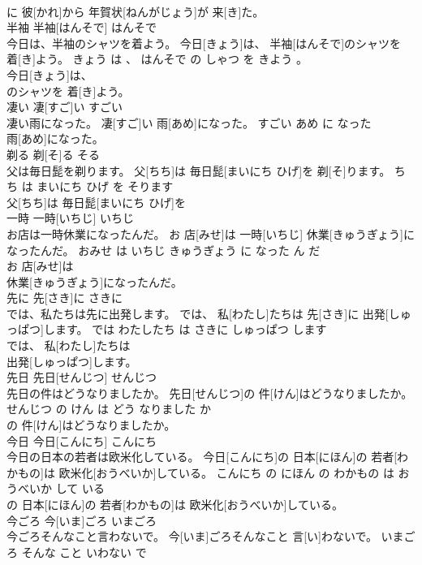 \documentclass[8pt]{extreport}
\begin{document}
\begin{CJK}{UTF8}{min}
\\	に 彼[かれ]から 年賀状[ねんがじょう]が 来[き]た。			
\\	半袖	半袖[はんそで]	はんそで	
\\	今日は、半袖のシャツを着よう。	今日[きょう]は、 半袖[はんそで]のシャツを 着[き]よう。	きょう は 、 はんそで の しゃつ を きよう 。	
\\	今日[きょう]は、
\\	のシャツを 着[き]よう。			
\\	凄い	凄[すご]い	すごい	
\\	凄い雨になった。	凄[すご]い 雨[あめ]になった。	すごい あめ に なった	
\\	雨[あめ]になった。			
\\	剃る	剃[そ]る	そる	
\\	父は毎日髭を剃ります。	父[ちち]は 毎日髭[まいにち ひげ]を 剃[そ]ります。	ちち は まいにち ひげ を そります	
\\	父[ちち]は 毎日髭[まいにち ひげ]を
\\	一時	一時[いちじ]	いちじ	
\\	お店は一時休業になったんだ。	お 店[みせ]は 一時[いちじ] 休業[きゅうぎょう]になったんだ。	おみせ は いちじ きゅうぎょう に なった ん だ	
\\	お 店[みせ]は
\\	休業[きゅうぎょう]になったんだ。			
\\	先に	先[さき]に	さきに	
\\	では、私たちは先に出発します。	では、 私[わたし]たちは 先[さき]に 出発[しゅっぱつ]します。	では わたしたち は さきに しゅっぱつ します	
\\	では、 私[わたし]たちは
\\	出発[しゅっぱつ]します。			
\\	先日	先日[せんじつ]	せんじつ	
\\	先日の件はどうなりましたか。	先日[せんじつ]の 件[けん]はどうなりましたか。	せんじつ の けん は どう なりました か	
\\	の 件[けん]はどうなりましたか。			
\\	今日	今日[こんにち]	こんにち	
\\	今日の日本の若者は欧米化している。	今日[こんにち]の 日本[にほん]の 若者[わかもの]は 欧米化[おうべいか]している。	こんにち の にほん の わかもの は おうべいか して いる	
\\	の 日本[にほん]の 若者[わかもの]は 欧米化[おうべいか]している。			
\\	今ごろ	今[いま]ごろ	いまごろ	
\\	今ごろそんなこと言わないで。	今[いま]ごろそんなこと 言[い]わないで。	いまごろ そんな こと いわない で	

\end{CJK}
\end{document}
